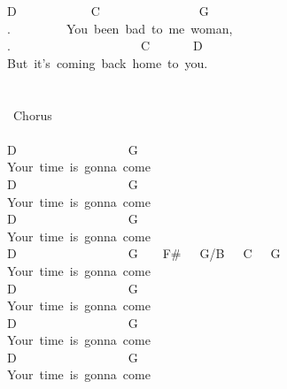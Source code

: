 {D\ \ \ \ \ \ \ \ \ \ \ \ C\ \ \ \ \ \ \ \ \ \ \ \ \ \ \ \ G\\
.\ \ \ \ \ \ \ \ \ You\ been\ bad\ to\ me\ woman,\\
.\ \ \ \ \ \ \ \ \ \ \ \ \ \ \ \ \ \ \ \ \ C\ \ \ \ \ \ \ D\\
But\ it's\ coming\ back\ home\ to\ you.\\
\\
\\
\lbrack\ Chorus\rbrack\\
\\
D\ \ \ \ \ \ \ \ \ \ \ \ \ \ \ \ \ \ G\\
Your\ time\ is\ gonna\ come\ \\
D\ \ \ \ \ \ \ \ \ \ \ \ \ \ \ \ \ \ G\\
Your\ time\ is\ gonna\ come\\
D\ \ \ \ \ \ \ \ \ \ \ \ \ \ \ \ \ \ G\\
Your\ time\ is\ gonna\ come\\
D\ \ \ \ \ \ \ \ \ \ \ \ \ \ \ \ \ \ G\ \ \ \ F\#\ \ \ G/B\ \ \ C\ \ \ G\\
Your\ time\ is\ gonna\ come\\
D\ \ \ \ \ \ \ \ \ \ \ \ \ \ \ \ \ \ G\ \\
Your\ time\ is\ gonna\ come\\
D\ \ \ \ \ \ \ \ \ \ \ \ \ \ \ \ \ \ G\ \ \ \ \ \\
Your\ time\ is\ gonna\ come\\
D\ \ \ \ \ \ \ \ \ \ \ \ \ \ \ \ \ \ G\\
Your\ time\ is\ gonna\ come}

